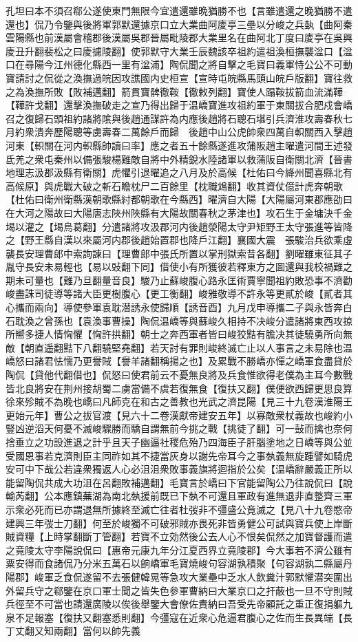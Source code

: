 孔坦曰本不須召郗公遂使東門無限今宜遣還雖晩猶勝不也【言雖遣還之晚猶勝不遣還也】侃乃令鑒與後將軍郭默還據京口立大業曲阿庱亭三壘以分峻之兵埶【曲阿秦雲陽縣也前漢屬會稽郡後漢屬吳郡晉屬毗陵郡大業里名在曲阿北丁度曰庱亭在吳興庱丑升翻裴松之曰庱攄陵翻】使郭默守大業壬辰魏該卒祖約遣祖渙桓撫襲湓口【湓口在尋陽今江州德化縣西一里有湓浦】陶侃聞之將自擊之毛寶曰義軍恃公公不可動寶請討之侃從之渙撫過皖因攻譙國内史桓宣【宣時屯皖縣馬頭山皖戶版翻】寶往救之為渙撫所敗【敗補邁翻】箭貫寶髀徹鞍【徹敕列翻】寶使人蹋鞍拔箭血流滿鞾【鞾許戈翻】還擊渙撫破走之宣乃得出歸于温嶠寶進攻祖約軍于東關拔合肥戍會嶠召之復歸石頭祖約諸將隂與後趙通謀許為内應後趙將石聰石堪引兵濟淮攻壽春秋七月約衆潰奔歷陽聰等虜壽春二萬餘戶而歸　後趙中山公虎帥衆四萬自軹關西入擊趙河東【軹關在河内軹縣帥讀曰率】應之者五十餘縣遂進攻蒲阪趙主曜遣河間王述發氐羌之衆屯秦州以備張駿楊難敵自將中外精銳水陸諸軍以救蒲阪自衛關北濟【晉書地理志汲郡汲縣有衛關】虎懼引退曜追之八月及於高候【杜佑曰今絳州聞喜縣北有高候原】與虎戰大破之斬石瞻枕尸二百餘里【枕職鴆翻】收其資仗億計虎奔朝歌【杜佑曰衛州衛縣漢朝歌縣紂都朝歌在今縣西】曜濟自大陽【大陽屬河東郡應劭曰在大河之陽故曰大陽唐志陜州陜縣有大陽故關春秋之茅津也】攻石生于金墉決千金堨以灌之【堨烏葛翻】分遣諸將攻汲郡河内後趙滎陽太守尹矩野王太守張進等皆降之【野王縣自漢以來屬河内郡後趙始置郡也降戶江翻】襄國大震　張駿治兵欲乘虛襲長安理曹郎中索詢諫曰【理曹郎中張氏所置以掌刑獄索昔各翻】劉曜雖東征其子胤守長安未易輕也【易以䜴翻下同】借使小有所獲彼若釋東方之圖還與我校禍難之期未可量也【難乃旦翻量音良】駿乃止蘇峻腹心路永匡術賈寧聞祖約敗恐事不濟勸峻盡誅司徒導等諸大臣更樹腹心【更工衡翻】峻雅敬導不許永等更貳於峻【貳者其心攜而兩向】導使參軍袁耽潜誘永使歸順【誘音酉】九月戊申導攜二子與永皆奔白石耽渙之曾孫也【袁渙事曹操】陶侃温嶠等與蘇峻久相持不决峻分遣諸將東西攻掠所嚮多捷人情恟懼【恟許拱翻】朝士之奔西軍者皆曰峻狡黠有膽决其徒驍勇所向無敵【朝直遥翻黠下八翻驍堅堯翻】若天討有罪則峻終滅亡止以人事言之未易除也温嶠怒曰諸君怯懦乃更譽賊【譽羊諸翻稱揚之也】及累戰不勝嶠亦憚之嶠軍食盡貸於陶侃【貸他代翻借也】侃怒曰使君前云不憂無良將及兵食惟欲得老僕為主耳今數戰皆北良將安在荆州接胡蜀二虜當備不虞若復無食【復扶又翻】僕便欲西歸更思良算徐來殄賊不為晚也嶠曰凡師克在和古之善教也光武之濟昆陽【見三十九卷漢淮陽王更始元年】曹公之拔官渡【見六十二卷漢獻帝建安五年】以寡敵衆杖義故也峻約小豎凶逆滔天何憂不滅峻驟勝而驕自謂無前今挑之戰【挑徒了翻】可一鼔而擒也奈何捨垂立之功設進退之計乎且天子幽逼社稷危殆乃四海臣子肝腦塗地之日嶠等與公並受國恩事若克濟則臣主同祚如其不捷當灰身以謝先帝耳今之事埶義無旋踵譬如騎虎安可中下哉公若違衆獨返人心必沮沮衆敗事義旗將迴指於公矣【温嶠辭嚴義正所以能留陶侃共成大功沮在呂翻敗補邁翻】毛寶言於嶠曰下官能留陶公乃往說侃曰【說輸芮翻】公本應鎮蕪湖為南北埶援前既已下埶不可還且軍政有進無退非直整齊三軍示衆必死而已亦謂退無所據終至滅亡往者杜弢非不彊盛公竟滅之【見八十九卷愍帝建興三年弢士刀翻】何至於峻獨不可破邪賊亦畏死非皆勇健公可試與寶兵使上岸斷賊資糧【上時掌翻斷丁管翻】若寶不立効然後公去人心不恨矣侃然之加寶督護而遣之竟陵太守李陽說侃曰【惠帝元康九年分江夏西界立竟陵郡】今大事若不濟公雖有粟安得而食諸侃乃分米五萬石以餉嶠軍毛寶燒峻句容湖孰積聚【句容湖孰二縣屬丹陽郡】峻軍乏食侃遂留不去張健韓晃等急攻大業壘中乏水人飲糞汁郭默懼潜突圍出外留兵守之郗鑒在京口軍士聞之皆失色參軍曹納曰大業京口之扞蔽也一旦不守則賊兵徑至不可當也請還廣陵以俟後舉鑒大會僚佐責納曰吾受先帝顧託之重正復捐軀九泉不足報塞【復扶又翻塞悉則翻】今彊寇在近衆心危逼君腹心之佐而生長異端【長丁丈翻又知兩翻】當何以帥先義